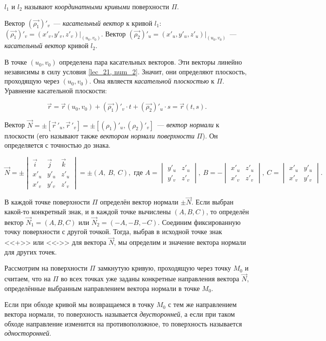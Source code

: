 \documentclass[../../main.tex]{subfiles}
\begin{document}
$l_1$ и $l_2$ называют \emph{координатными кривыми} поверхности $\Pi$.

Вектор $(\vec{\rho_1})'_v$~--- \emph{касательный вектор} к кривой $l_1$:
$(\vec{\rho_1})'_v = (x'_v, y'_v, z'_v) \Big|_{(u_0,v_0)}.$
Вектор $(\vec{\rho_2})'_u = (x'_u, y'_u, z'_u) \Big|_{(u_0,v_0)}$~--- 
\emph{касательный вектор} кривой $l_2$. 

В точке $(u_0, v_0)$ определена пара касательных векторов.
Эти векторы линейно независимы в силу условия \eqref{lec_21, num_2}. 
Значит, они определяют плоскость, проходящую через $(u_0,v_0)$.
Она являестя \emph{касательной плоскостью} к $\Pi$. 
Уравнение касательной плоскости:

\[\vec{r} = \vec{r}(u_0,v_0) + (\vec{\rho_1})'_v \cdot t +
(\vec{\rho_2})'_u \cdot s = 
\vec{r}(t,s)
.\]

Вектор $\vec{N} = \pm \left[ \vec r\,'_u, \vec r\,'_v \right] = 
\pm \left[ (\rho_1)'_u, (\rho_2)'_v  \right]$~--- 
\emph{вектор нормали} к плоскости 
(его называют также \emph{вектором нормали поверхности} $\Pi$).
Он определяется с точностью до знака.

\[
\vec{N} = 
\pm \begin{vmatrix}
\vec{i} & \vec{j} & \vec{k} \\
x'_u & y'_u & z'_u \\
x'_v & y'_v & z'_v
\end{vmatrix} = 
\pm (A,\ B,\ C)
, \text{ где } A = \begin{vmatrix}
y'_u & z'_u \\
 y'_v & z'_v
\end{vmatrix},\ 
B = -\begin{vmatrix}
x'_u & z'_u \\
x'_v & z'_v
\end{vmatrix},\
C = \begin{vmatrix}
x'_u & y'_u \\
x'_v & y'_v
\end{vmatrix}
.\]

В каждой точке поверхности $\Pi$ определён вектор нормали $\pm \vec{N}$.
Если выбран какой-то конкретный знак, и в каждой точке вычислены
$(A, B, C)$, то определён вектор $\vec{N}_1 = (A, B, C)$ или
$\vec{N}_2 = (-A, -B, -C)$.
Соединим фиксированную точку поверхности с другой точкой.
Тогда, выбрав в исходной точке знак <<+>> или <<->> для вектора $\vec{N}$,
мы определим и значение вектора нормали для других точек.

Рассмотрим на поверхности $\Pi$ замкнутую кривую, 
проходящую через точку $M_0$ и
считаем, что на $\Pi$ во всех точках уже заданы конкретные направления
вектора $\vec{N}$, определённые выбранным направлением вектора нормали в точке 
$M_0$. 

Если при обходе кривой мы возвращаемся в точку $M_0$ с тем же
направлением вектора нормали, то поверхность называется \emph{двусторонней},
а если при таком обходе направление изменится на противоположное,
то поверхность называется \emph{односторонней}.
\end{document}
